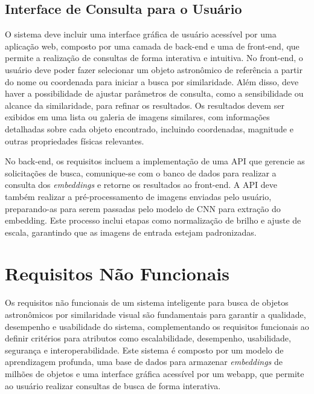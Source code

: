 \subsection{Interface de Consulta para o Usuário}
\label{sec:req-webapp}

O sistema deve incluir uma interface gráfica de usuário acessível por uma aplicação web, composto por uma camada de back-end e uma de front-end, que permite a realização de consultas de forma interativa e intuitiva. No front-end, o usuário deve poder fazer  selecionar um objeto astronômico de referência a partir do nome ou coordenada para iniciar a busca por similaridade. Além disso, deve haver a possibilidade de ajustar parâmetros de consulta, como a sensibilidade ou alcance da similaridade, para refinar os resultados. Os resultados devem ser exibidos em uma lista ou galeria de imagens similares, com informações detalhadas sobre cada objeto encontrado, incluindo coordenadas, magnitude e outras propriedades físicas relevantes.

No back-end, os requisitos incluem a implementação de uma API que gerencie as solicitações de busca, comunique-se com o banco de dados para realizar a consulta dos \emph{embeddings} e retorne os resultados ao front-end. A API deve também realizar a pré-processamento de imagens enviadas pelo usuário, preparando-as para serem passadas pelo modelo de CNN para extração do embedding. Este processo inclui etapas como normalização de brilho e ajuste de escala, garantindo que as imagens de entrada estejam padronizadas.






\section{Requisitos Não Funcionais}
\label{sec:req-nao-funcionais}

Os requisitos não funcionais de um sistema inteligente para busca de objetos astronômicos por similaridade visual são fundamentais para garantir a qualidade, desempenho e usabilidade do sistema, complementando os requisitos funcionais ao definir critérios para atributos como escalabilidade, desempenho, usabilidade, segurança e interoperabilidade. Este sistema é composto por um modelo de aprendizagem profunda, uma base de dados para armazenar \emph{embeddings} de milhões de objetos e uma interface gráfica acessível por um webapp, que permite ao usuário realizar consultas de busca de forma interativa.





